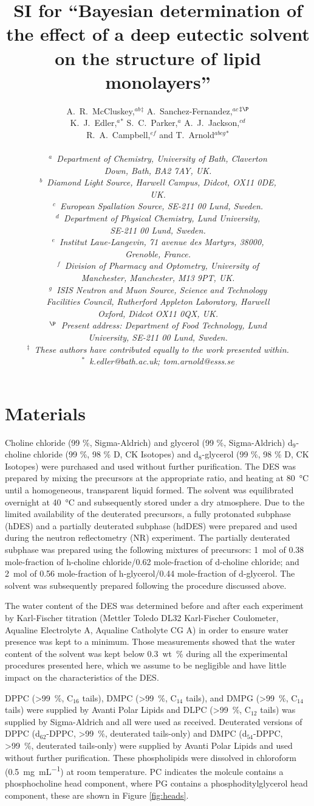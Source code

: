 \documentclass[11pt,a4paper]{article}
\author{A.~R.~McCluskey,\textit{$^{ab}$}$^{\ddag}$ A.~Sanchez-Fernandez,\textit{$^{ac}$}$^{\ddag\P}$ \\
K.~J.~Edler,\textit{$^{a}$}$^{\ast}$ S.~C.~Parker,\textit{$^{a}$} A.~J.~Jackson,\textit{$^{cd}$} \\
R.~A.~Campbell,\textit{$^{ef}$} and T.~Arnold\textit{$^{abcg}$}$^{\ast}$ \\
 \\
\textit{$^{a}$~Department of Chemistry, University of Bath, Claverton} \\
\textit{Down, Bath, BA2 7AY, UK.} \\
\textit{$^{b}$~Diamond Light Source, Harwell Campus, Didcot, OX11 0DE,} \\
\textit{UK.} \\
\textit{$^{c}$~European Spallation Source, SE-211 00 Lund, Sweden.} \\
\textit{$^{d}$~Department of Physical Chemistry, Lund University,} \\
\textit{SE-211 00 Lund, Sweden.} \\
\textit{$^{e}$~Institut Laue-Langevin, 71 avenue des Martyrs, 38000,} \\
\textit{Grenoble, France.} \\
\textit{$^{f}$~Division of Pharmacy and Optometry, University of} \\
\textit{Manchester, Manchester, M13 9PT, UK.} \\
\textit{$^{g}$~ISIS Neutron and Muon Source, Science and Technology} \\
\textit{Facilities Council, Rutherford Appleton Laboratory, Harwell} \\
\textit{Oxford, Didcot OX11 0QX, UK.} \\
\textit{$^{\P}$~Present address: Department of Food Technology, Lund} \\
\textit{University, SE-211 00 Lund, Sweden.} \\
\textit{$^\ddag$~These authors have contributed equally to the work presented within.} \\
\textit{$^\ast$~k.edler@bath.ac.uk; tom.arnold@esss.se}}
\title{SI for ``Bayesian determination of the effect of a deep eutectic solvent on the structure of lipid monolayers''}
\date{}
\begin{document}
\maketitle

\section{Materials}
Choline chloride (99 \%, Sigma-Aldrich) and glycerol (99 \%, Sigma-Aldrich) d$_9$-choline chloride (99 \%, 98 \% D, CK Isotopes) and d$_8$-glycerol (99 \%, 98 \% D, CK Isotopes)  were purchased and used without further purification. The DES was prepared by mixing the precursors at the appropriate ratio, and heating at \SI{80}{\celsius} until a homogeneous, transparent liquid formed.\cite{Smith2014} The solvent was equilibrated overnight at \SI{40}{\celsius} and subsequently stored under a dry atmosphere. Due to the limited availability of the deuterated precursors, a fully protonated subphase (hDES) and a partially deuterated subphase (hdDES) were prepared and used during the neutron reflectometry (NR) experiment. The partially deuterated subphase was prepared using the following mixtures of precursors: \SI{1}{\mole} of 0.38 mole-fraction of h-choline chloride/0.62 mole-fraction of d-choline chloride; and \SI{2}{\mole} of 0.56 mole-fraction of h-glycerol/0.44 mole-fraction of d-glycerol. The solvent was subsequently prepared following the procedure discussed above.

The water content of the DES was determined before and after each experiment by Karl-Fischer titration (Mettler Toledo DL32 Karl-Fischer Coulometer, Aqualine Electrolyte A, Aqualine Catholyte CG A) in order to ensure water presence was kept to a minimum. Those measurements showed that the water content of the solvent was kept below \SI{0.3}{wt\percent} during all the experimental procedures presented here, which we assume to be negligible and have little impact on the characteristics of the DES.\cite{Hammond2016,Hammond2017}

DPPC (\SI{>99}{\percent}, C$_{16}$ tails), DMPC (\SI{>99}{\percent}, C$_{14}$ tails), and DMPG (\SI{>99}{\percent}, C$_{14}$ tails) were supplied by Avanti Polar Lipids and DLPC (\SI{>99}{\percent}, C$_{12}$ tails) was supplied by Sigma-Aldrich and all were used as received. Deuterated versions of DPPC (d$_{62}$-DPPC, \SI{>99}{\percent}, deuterated tails-only) and DMPC (d$_{54}$-DPPC, \SI{>99}{\percent}, deuterated tails-only) were supplied by Avanti Polar Lipids and used without further purification. These phospholipids were dissolved in chloroform (\SI{0.5}{\milli\gram\per\milli\liter}) at room temperature. PC indicates the molcule contains a phosphocholine head component, where PG contains a phosphoditylglycerol head component, these are shown in Figure \ref{fig:heads}.
\end{document}
